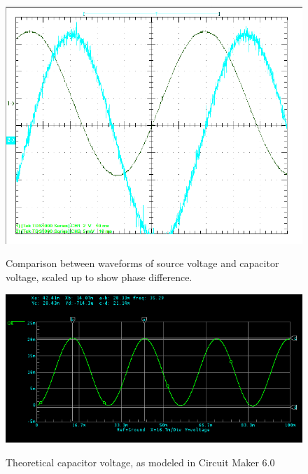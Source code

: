 \documentclass[twocolumn,english]{IEEEtran}
\theoremstyle{plain}
\theoremstyle{plain}
\begin{document}
\begin{figure}[h!]
  \begin{centering}
  \begin{center}
  \includegraphics[width=\linewidth]{./Images/comparison.png}
  \label{fig:parallel_diagram}
  \caption{Comparison between waveforms of source voltage and capacitor voltage, scaled up to show phase difference.}
  \end{center}
  \par\end{centering}
  \end{figure}

  \begin{figure}[h!]
  \begin{centering}
  \begin{center}
  \includegraphics[width=\linewidth]{./Images/waveform.png}
  \label{fig:theory_wave}
  \caption{Theoretical capacitor voltage, as modeled in Circuit Maker 6.0}
  \end{center}
  \par\end{centering}
  \end{figure}
\end{document}
